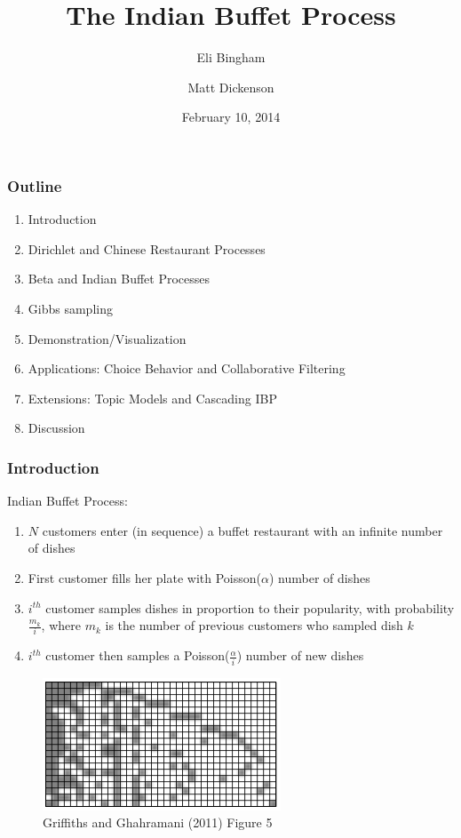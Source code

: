 \documentclass[13pt]{beamer}
\title[Indian Buffet Process]{The Indian Buffet Process}
\author[Bingham and Dickenson]{Eli Bingham\inst{1} \and Matt Dickenson\inst{2}}
\institute[UNC and Duke]{\inst{1} University of North Carolina \and \inst{2} Duke University}
\date{February 10, 2014}
\begin{document}
\begin{frame}
\titlepage
\end{frame}
\begin{frame}
\frametitle{Outline}
\begin{enumerate}
\item Introduction
\item Dirichlet and Chinese Restaurant Processes
\item Beta and Indian Buffet Processes
\item Gibbs sampling
\item Demonstration/Visualization
\item Applications: Choice Behavior and Collaborative Filtering
\item Extensions: Topic Models and Cascading IBP
\item Discussion
\end{enumerate}
\end{frame}
\begin{frame}
\frametitle{Introduction}

Indian Buffet Process:
\begin{enumerate}
\item $N$ customers enter (in sequence) a buffet restaurant with an infinite number of dishes
\item First customer fills her plate with Poisson($\alpha$) number of dishes
\item $i^{th}$ customer samples dishes in proportion to their popularity, with probability $\frac{m_k}{i}$, where $m_k$ is the number of previous customers who sampled dish $k$
\item $i^{th}$ customer then samples a Poisson($\frac{\alpha}{i}$) number of new dishes
\end{enumerate}

\begin{figure}
\begin{center}
\includegraphics[scale=0.5]{./img/ibp-sorted.png}
\caption{Griffiths and Ghahramani (2011) Figure 5}
\end{center}
\end{figure}

\end{frame}
\end{document}
